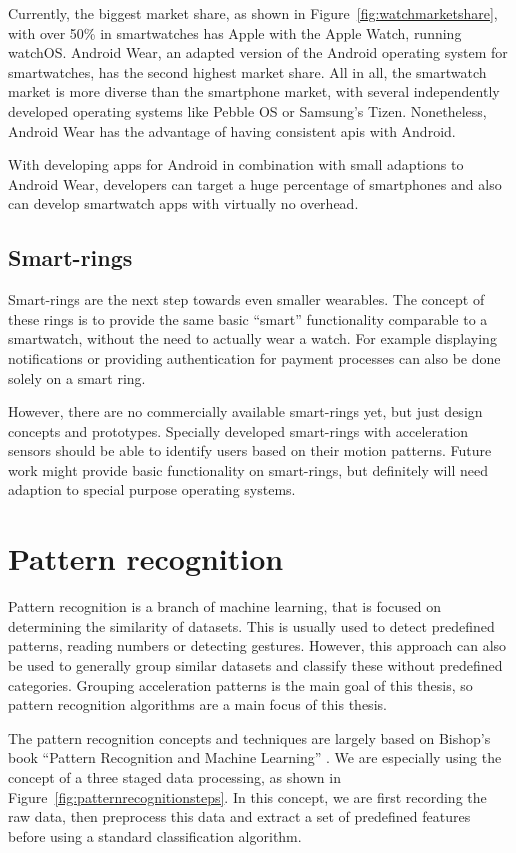 Currently, the biggest market share, as shown in Figure~\ref{fig:watchmarketshare}, with over 50\% in smartwatches has Apple with the Apple Watch, running watchOS. Android Wear, an adapted version of the Android operating system for smartwatches, has the second highest market share. All in all, the smartwatch market is more diverse than the smartphone market, with several independently developed operating systems like Pebble OS or Samsung's Tizen. Nonetheless, Android Wear has the advantage of having consistent \Glspl{api} with Android. 

With developing \glspl{app} for Android in combination with small adaptions to Android Wear, developers can target a huge percentage of smartphones and also can develop smartwatch apps with virtually no overhead.

\subsection{Smart-rings}
Smart-rings are the next step towards even smaller wearables. The concept of these rings is to provide the same basic ``smart'' functionality comparable to a smartwatch, without the need to actually wear a watch. For example displaying notifications or providing authentication for payment processes can also be done solely on a smart ring.

However, there are no commercially available smart-rings yet, but just design concepts and prototypes. Specially developed smart-rings with acceleration sensors should be able to identify users based on their motion patterns. Future work might provide basic functionality on smart-rings, but definitely will need adaption to special purpose operating systems. 

\section{Pattern recognition}
Pattern recognition is a branch of machine learning, that is focused on determining the similarity of datasets. This is usually used to detect predefined patterns, \eg reading numbers or detecting gestures. However, this approach can also be used to generally group similar datasets and classify these without predefined categories. Grouping acceleration patterns is the main goal of this thesis, so pattern recognition algorithms are a main focus of this thesis.

The pattern recognition concepts and techniques are largely based on Bishop's book ``Pattern Recognition and Machine Learning'' \cite{bishop2006pattern}. We are especially using the concept of a three staged data processing, as shown in Figure~\ref{fig:patternrecognitionsteps}. In this concept, we are first recording the raw data, then preprocess this data and extract a set of predefined features before using a standard classification algorithm.

